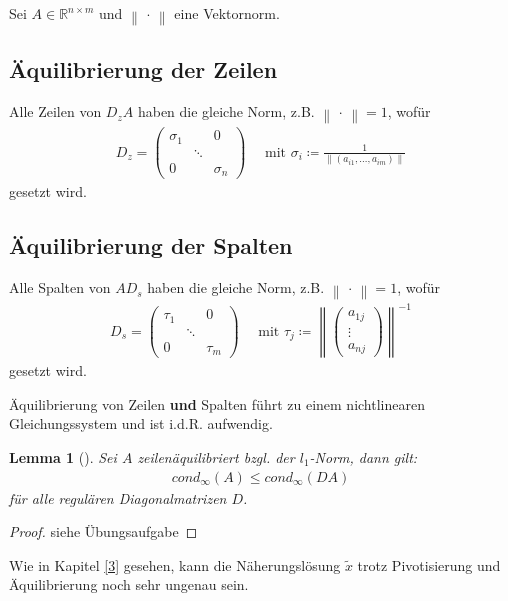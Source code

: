 \documentclass[ngerman,fontsize=11pt, paper=a4, parskip=half, titlepage=true, toc=bib]{scrbook}
\theoremstyle{definition}
\theoremstyle{plain}
\newtheorem{Lem}[Def]{Lemma}		%
\newcommand{\Renm}{\mathds{R}^{n\times m}}
\newcommand{\nn}[1]{\left\| #1 \right\|}
\newcommand{\subsectione}[1]{\addtocounter{Def}{1}\subsection{#1}}
\newenvironment{Leme}[1][]{ %
  \begin{Lem}[#1]
  }
  {
  \end{Lem}
  \addtocounter{subsection}{1}
}
\begin{document}
Sei $A\in\Renm $ und $\nn{\,\cdot\,} $ eine Vektornorm.


\subsectione{Äquilibrierung der Zeilen} 
Alle Zeilen von $D_zA$ haben die gleiche Norm, z.B. $\nn{\,\cdot\,} =1$, wofür 
\begin{gather}
  D_z = \begin{pmatrix}
    \sigma_1 & & 0 \\
    &\ddots & \\ 
    0 && \sigma_n
  \end{pmatrix}
  \quad \text{ mit }\sigma_i\coloneqq \frac{1}{\nn{(a_{i1}, \dots , a_{im})}}
  \label{IV.1.1}
\end{gather}
gesetzt wird.


\subsectione{Äquilibrierung der Spalten} 
Alle Spalten von $AD_s$ haben die gleiche Norm, z.B. $\nn{\,\cdot\,} =1$, wofür 
\begin{gather}
  D_s = \begin{pmatrix}
    \tau_1 & & 0 \\
    &\ddots & \\ 
    0 && \tau_m
  \end{pmatrix}
  \quad \text{ mit }\tau_j\coloneqq \nn{\begin{pmatrix}
      a_{1j} \\ \vdots \\ a_{nj}
    \end{pmatrix}}^{-1}
  \label{IV.1.2}
\end{gather}
gesetzt wird.

Äquilibrierung von Zeilen \textbf{und} Spalten führt zu einem nichtlinearen Gleichungssystem und ist i.d.R. aufwendig.


\begin{Leme}
  \label{4.3.1}
  Sei $A$ zeilenäquilibriert bzgl. der $l_1$-Norm, dann gilt:
  \begin{gather}
    cond_{\infty}(A) \leq cond_{\infty}(DA)  \label{IV.1.3}
  \end{gather}
  für alle regulären Diagonalmatrizen $D$.
\end{Leme} 

\begin{proof}
  siehe Übungsaufgabe
\end{proof}

Wie in Kapitel \ref{3} gesehen, kann die Näherungslösung $\widetilde{x}$ 
trotz Pivotisierung und Äquilibrierung noch sehr ungenau sein.
\end{document}
